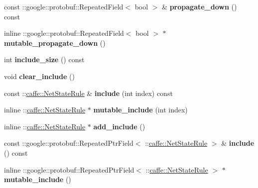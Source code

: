\begin{DoxyCompactItemize}
const \+::google\+::protobuf\+::\+Repeated\+Field$<$ bool $>$ \& {\bfseries propagate\+\_\+down} () const
\item 
\mbox{\label{classcaffe_1_1_layer_parameter_ab85078d064b0992908a0155c1a4c7b59}} 
inline \+::google\+::protobuf\+::\+Repeated\+Field$<$ bool $>$ $\ast$ {\bfseries mutable\+\_\+propagate\+\_\+down} ()
\item 
\mbox{\label{classcaffe_1_1_layer_parameter_a6dfe6a95d7c995c498ac09e177d9ae1a}} 
int {\bfseries include\+\_\+size} () const
\item 
\mbox{\label{classcaffe_1_1_layer_parameter_a166f7ea6bac1a8b53854f2a00ca2b99c}} 
void {\bfseries clear\+\_\+include} ()
\item 
\mbox{\label{classcaffe_1_1_layer_parameter_a45a069bb582de2d4c3829d2e56b5ce68}} 
const \+::\mbox{\hyperlink{classcaffe_1_1_net_state_rule}{caffe\+::\+Net\+State\+Rule}} \& {\bfseries include} (int index) const
\item 
\mbox{\label{classcaffe_1_1_layer_parameter_a5d728e8b7683ad8ecfeef79f72138860}} 
inline \+::\mbox{\hyperlink{classcaffe_1_1_net_state_rule}{caffe\+::\+Net\+State\+Rule}} $\ast$ {\bfseries mutable\+\_\+include} (int index)
\item 
\mbox{\label{classcaffe_1_1_layer_parameter_a77d8639d3e355f4c7c04ff9e3392f372}} 
inline \+::\mbox{\hyperlink{classcaffe_1_1_net_state_rule}{caffe\+::\+Net\+State\+Rule}} $\ast$ {\bfseries add\+\_\+include} ()
\item 
\mbox{\label{classcaffe_1_1_layer_parameter_a34f90ac46304bbd0083495fab53309c7}} 
const \+::google\+::protobuf\+::\+Repeated\+Ptr\+Field$<$ \+::\mbox{\hyperlink{classcaffe_1_1_net_state_rule}{caffe\+::\+Net\+State\+Rule}} $>$ \& {\bfseries include} () const
\item 
\mbox{\label{classcaffe_1_1_layer_parameter_a8e2da6a2e7ae89b767171c743df10d79}} 
inline \+::google\+::protobuf\+::\+Repeated\+Ptr\+Field$<$ \+::\mbox{\hyperlink{classcaffe_1_1_net_state_rule}{caffe\+::\+Net\+State\+Rule}} $>$ $\ast$ {\bfseries mutable\+\_\+include} ()

\end{DoxyCompactItemize}
